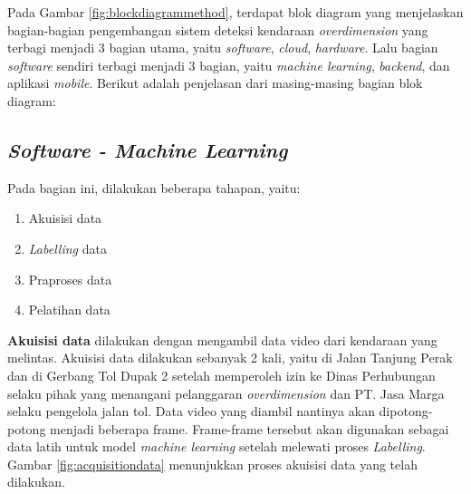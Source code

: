 Pada Gambar \ref{fig:blockdiagrammethod}, terdapat blok diagram yang menjelaskan bagian-bagian pengembangan sistem deteksi kendaraan \emph{overdimension} yang terbagi menjadi 3 bagian utama, yaitu \emph{software}, \emph{cloud}, \emph{hardware}. Lalu bagian \emph{software} sendiri terbagi menjadi 3 bagian, yaitu \emph{machine learning}, \emph{backend}, dan aplikasi \emph{mobile}. Berikut adalah penjelasan dari masing-masing bagian blok diagram:

\subsection{\emph{Software - Machine Learning}}
Pada bagian ini, dilakukan beberapa tahapan, yaitu:
\begin{enumerate}[nolistsep]
  \item Akuisisi data
  \item \emph{Labelling} data
  \item Praproses data
  \item Pelatihan data
\end{enumerate}

\textbf{Akuisisi data} dilakukan dengan mengambil data video dari kendaraan yang melintas. Akuisisi data dilakukan sebanyak 2 kali, yaitu di Jalan Tanjung Perak dan di Gerbang Tol Dupak 2 setelah memperoleh izin ke Dinas Perhubungan selaku pihak yang menangani pelanggaran \emph{overdimension} dan PT. Jasa Marga selaku pengelola jalan tol. Data video yang diambil nantinya akan dipotong-potong menjadi beberapa frame. Frame-frame tersebut akan digunakan sebagai data latih untuk model \emph{machine learning} setelah melewati proses \emph{Labelling}. Gambar \ref{fig:acquisitiondata} menunjukkan proses akuisisi data yang telah dilakukan.

